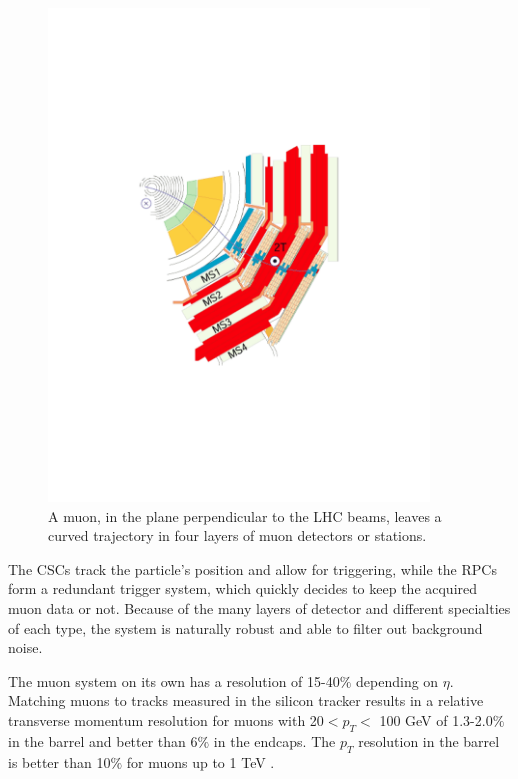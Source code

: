     \begin{figure}[H]
 	\centering
 	\includegraphics[width=0.9\textwidth]{figures/MuStations.pdf}
 	\singlespace
 	\caption{A muon, in the plane perpendicular to the LHC beams, leaves a curved trajectory in four layers of muon detectors or stations.}
 	\label{fig:cmsmuchambers}
	\end{figure}

The CSCs track the particle's position and allow for triggering, while the RPCs form a redundant trigger system, which quickly decides to keep the acquired muon data or not. Because of the many layers of detector and different specialties of each type, the system is naturally robust and able to filter out background noise.

The muon system on its own has a resolution of 15-40$\%$ depending on $\eta$. Matching muons to tracks measured in the silicon tracker results in a relative transverse momentum resolution for muons with 20$< p_{T} < $ 100 GeV of 1.3-2.0$\%$ in the barrel and better than 6$\%$ in the endcaps. The $p_{T}$ resolution in the barrel is better than 10$\%$ for muons up to 1 TeV \cite{Chatrchyan:2012xi}.


